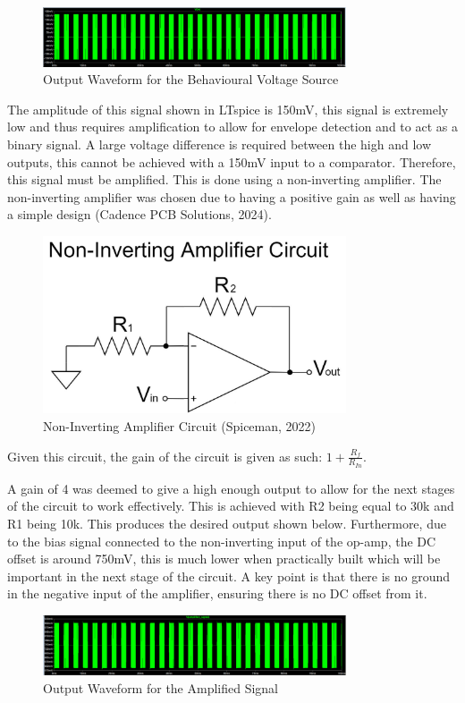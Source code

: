 \begin{figure}[h]
    \centering
    \includegraphics[width=0.8\textwidth]{subpages/images/ultra_bv_output.png}
    \caption{Output Waveform for the Behavioural Voltage Source}
    \label{fig:bv_waveform}
\end{figure}
The amplitude of this signal shown in LTspice is 150mV, this signal is extremely low and thus requires amplification to allow for envelope detection and to act as a binary signal. A large voltage difference is required between the high and low outputs, this cannot be achieved with a 150mV input to a comparator. Therefore, this signal must be amplified. This is done using a non-inverting amplifier.  The non-inverting amplifier was chosen due to having a positive gain as well as having a simple design (Cadence PCB Solutions, 2024).
\begin{figure}[h]
    \centering
    \includegraphics[width=0.8\textwidth]{subpages/images/non_invert_amp.png}
    \caption{Non-Inverting Amplifier Circuit (Spiceman, 2022)}
    \label{fig:non_inverting_amp}
\end{figure}
Given this circuit, the gain of the circuit is given as such: \(1+ \frac{R_f}{R_{In}} \).

A gain of 4 was deemed to give a high enough output to allow for the next stages of the circuit to work effectively. This is achieved with R2 being equal to 30k and R1 being 10k. This produces the desired output shown below. Furthermore, due to the bias signal connected to the non-inverting input of the op-amp, the DC offset is around 750mV, this is much lower when practically built which will be important in the next stage of the circuit.  A key point is that there is no ground in the negative input of the amplifier, ensuring there is no DC offset from it.
\begin{figure}[h]
    \centering
    \includegraphics[width=0.8\textwidth]{subpages/images/ultra_output_amplified.png}
    \caption{Output Waveform for the Amplified Signal}
    \label{fig:amplified_output}
\end{figure}

